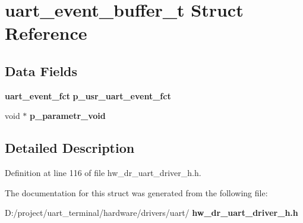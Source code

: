 \section{uart\+\_\+event\+\_\+buffer\+\_\+t Struct Reference}
\label{structuart__event__buffer__t}
\subsection*{Data Fields}
\begin{DoxyCompactItemize}
\item 
\mbox{\label{structuart__event__buffer__t_a2aa13eb22d30c3dd358d47444daf1800}} 
\textbf{ uart\+\_\+event\+\_\+fct} {\bfseries p\+\_\+usr\+\_\+uart\+\_\+event\+\_\+fct}
\item 
\mbox{\label{structuart__event__buffer__t_af752e0be0d8ca292d637313bada33817}} 
void $\ast$ {\bfseries p\+\_\+parametr\+\_\+void}
\end{DoxyCompactItemize}


\subsection{Detailed Description}


Definition at line 116 of file hw\+\_\+dr\+\_\+uart\+\_\+driver\+\_\+h.\+h.



The documentation for this struct was generated from the following file\+:\begin{DoxyCompactItemize}
\item 
D\+:/project/uart\+\_\+terminal/hardware/drivers/uart/\textbf{ hw\+\_\+dr\+\_\+uart\+\_\+driver\+\_\+h.\+h}\end{DoxyCompactItemize}
